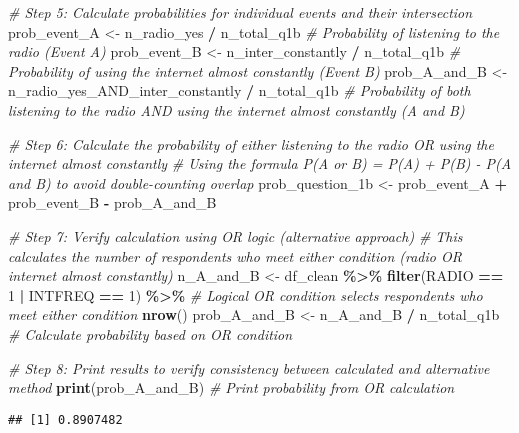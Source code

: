 \documentclass[
  11pt,
]{article}
\newenvironment{Shaded}{\begin{snugshade}}{\end{snugshade}}
\newcommand{\CommentTok}[1]{\textcolor[rgb]{0.56,0.35,0.01}{\textit{#1}}}
\newcommand{\DecValTok}[1]{\textcolor[rgb]{0.00,0.00,0.81}{#1}}
\newcommand{\FunctionTok}[1]{\textcolor[rgb]{0.13,0.29,0.53}{\textbf{#1}}}
\newcommand{\NormalTok}[1]{#1}
\newcommand{\OtherTok}[1]{\textcolor[rgb]{0.56,0.35,0.01}{#1}}
\newcommand{\SpecialCharTok}[1]{\textcolor[rgb]{0.81,0.36,0.00}{\textbf{#1}}}
\begin{document}
\begin{Shaded}
\begin{Highlighting}[]
\CommentTok{\# Step 5: Calculate probabilities for individual events and their intersection}
\NormalTok{prob\_event\_A }\OtherTok{\textless{}{-}}\NormalTok{ n\_radio\_yes }\SpecialCharTok{/}\NormalTok{ n\_total\_q1b  }\CommentTok{\# Probability of listening to the radio (Event A)}
\NormalTok{prob\_event\_B }\OtherTok{\textless{}{-}}\NormalTok{ n\_inter\_constantly }\SpecialCharTok{/}\NormalTok{ n\_total\_q1b  }\CommentTok{\# Probability of using the internet almost constantly (Event B)}
\NormalTok{prob\_A\_and\_B }\OtherTok{\textless{}{-}}\NormalTok{ n\_radio\_yes\_AND\_inter\_constantly }\SpecialCharTok{/}\NormalTok{ n\_total\_q1b  }\CommentTok{\# Probability of both listening to the radio AND using the internet almost constantly (A and B)}

\CommentTok{\# Step 6: Calculate the probability of either listening to the radio OR using the internet almost constantly}
\CommentTok{\# Using the formula P(A or B) = P(A) + P(B) {-} P(A and B) to avoid double{-}counting overlap}
\NormalTok{prob\_question\_1b }\OtherTok{\textless{}{-}}\NormalTok{ prob\_event\_A }\SpecialCharTok{+}\NormalTok{ prob\_event\_B }\SpecialCharTok{{-}}\NormalTok{ prob\_A\_and\_B}

\CommentTok{\# Step 7: Verify calculation using OR logic (alternative approach)}
\CommentTok{\# This calculates the number of respondents who meet either condition (radio OR internet almost constantly)}
\NormalTok{n\_A\_and\_B }\OtherTok{\textless{}{-}}\NormalTok{ df\_clean }\SpecialCharTok{\%\textgreater{}\%}
  \FunctionTok{filter}\NormalTok{(RADIO }\SpecialCharTok{==} \DecValTok{1} \SpecialCharTok{|}\NormalTok{ INTFREQ }\SpecialCharTok{==} \DecValTok{1}\NormalTok{) }\SpecialCharTok{\%\textgreater{}\%}  \CommentTok{\# Logical OR condition selects respondents who meet either condition}
  \FunctionTok{nrow}\NormalTok{()}
\NormalTok{prob\_A\_and\_B }\OtherTok{\textless{}{-}}\NormalTok{ n\_A\_and\_B }\SpecialCharTok{/}\NormalTok{ n\_total\_q1b  }\CommentTok{\# Calculate probability based on OR condition}

\CommentTok{\# Step 8: Print results to verify consistency between calculated and alternative method}
\FunctionTok{print}\NormalTok{(prob\_A\_and\_B)  }\CommentTok{\# Print probability from OR calculation}
\end{Highlighting}
\end{Shaded}

\begin{verbatim}
## [1] 0.8907482
\end{verbatim}
\end{document}
